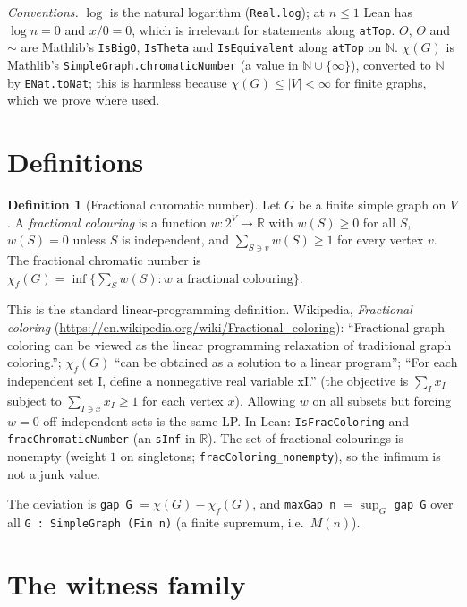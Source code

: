 \documentclass[11pt]{article}
\theoremstyle{definition}
\newtheorem{definition}[theorem]{Definition}
\theoremstyle{remark}
\begin{document}
\emph{Conventions.} $\log$ is the natural logarithm (\texttt{Real.log}); at $n\le 1$ Lean has
$\log n=0$ and $x/0=0$, which is irrelevant for statements along \texttt{atTop}. $O$, $\Theta$ and
$\sim$ are Mathlib's \texttt{IsBigO}, \texttt{IsTheta} and \texttt{IsEquivalent} along
\texttt{atTop} on $\mathbb{N}$. $\chi(G)$ is Mathlib's \texttt{SimpleGraph.chromaticNumber} (a value
in $\mathbb{N}\cup\{\infty\}$), converted to $\mathbb{N}$ by \texttt{ENat.toNat}; this is harmless
because $\chi(G)\le |V|<\infty$ for finite graphs, which we prove where used.

\section{Definitions}

\begin{definition}[Fractional chromatic number]
Let $G$ be a finite simple graph on $V$. A \emph{fractional colouring} is a function
$w:2^V\to\mathbb{R}$ with $w(S)\ge 0$ for all $S$, $w(S)=0$ unless $S$ is independent, and
$\sum_{S\ni v} w(S)\ge 1$ for every vertex $v$. The fractional chromatic number is
$\chi_f(G)=\inf\{\sum_S w(S): w \text{ a fractional colouring}\}$.
\end{definition}

This is the standard linear-programming definition. Wikipedia, \emph{Fractional coloring}
(\url{https://en.wikipedia.org/wiki/Fractional_coloring}): ``Fractional graph coloring can be viewed
as the linear programming relaxation of traditional graph coloring.''; $\chi_f(G)$ ``can be obtained
as a solution to a linear program''; ``For each independent set I, define a nonnegative real variable
xI.'' (the objective is $\sum_I x_I$ subject to $\sum_{I\ni x}x_I\ge 1$ for each vertex $x$).
Allowing $w$ on all subsets but forcing $w=0$ off independent sets is the same LP. In Lean:
\texttt{IsFracColoring} and \texttt{fracChromaticNumber} (an \texttt{sInf} in $\mathbb{R}$). The set
of fractional colourings is nonempty (weight $1$ on singletons; \texttt{fracColoring\_nonempty}), so
the infimum is not a junk value.

The deviation is \texttt{gap G} $=\chi(G)-\chi_f(G)$, and \texttt{maxGap n} $=\sup_{G}$
\texttt{gap G} over all \texttt{G : SimpleGraph (Fin n)} (a finite supremum, i.e.\ $M(n)$).

\section{The witness family}
\end{document}
